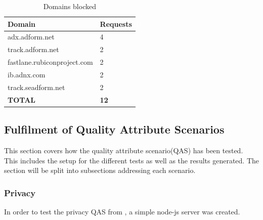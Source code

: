 \documentclass[main.tex]{subfiles}
\begin{document}
\begin{table}[H]
\centering
\begin{tabular}{|l|l|}
\hline
\textbf{Domain}             & \textbf{Requests} \\ \hline
adx.adform.net              & 4                 \\ \hline
track.adform.net            & 2                 \\ \hline
fastlane.rubiconproject.com & 2                 \\ \hline
ib.adnx.com                 & 2                 \\ \hline
track.seadform.net          & 2                 \\ \hline
\textbf{TOTAL}              & \textbf{12}       \\ \hline
\end{tabular}
\caption{Domains blocked}
\label{tab:yanf-stats}
\end{table}





\subsection{Fulfilment of Quality Attribute Scenarios}

This section covers how the quality attribute scenario(QAS) has been tested. This includes the setup for the different tests as well as the results generated. 
The section will be split into subsections addressing each scenario.




\subsubsection{Privacy}
\label{sec:PrivacyTest}
In order to test the privacy QAS from , a simple node-js server was created. 
\end{document}
